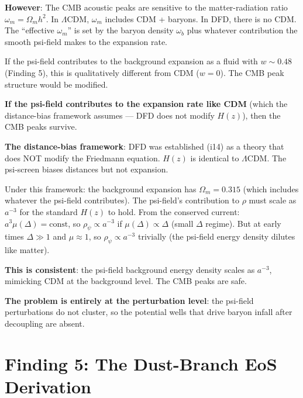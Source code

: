 \documentclass[11pt]{article}
\newcommand{\LCDM}{$\Lambda$CDM}
\begin{document}
\textbf{However}: The CMB acoustic peaks are sensitive to the
matter-radiation ratio $\omega_m = \Omega_m h^2$. In \LCDM,
$\omega_m$ includes CDM + baryons. In DFD, there is no CDM.
The ``effective $\omega_m$'' is set by the baryon density $\omega_b$
plus whatever contribution the smooth psi-field makes to the
expansion rate.

If the psi-field contributes to the background expansion as a fluid
with $w \sim 0.48$ (Finding 5), this is qualitatively different from
CDM ($w = 0$). The CMB peak structure would be modified.

\textbf{If the psi-field contributes to the expansion rate like CDM}
(which the distance-bias framework assumes --- DFD does not modify $H(z)$),
then the CMB peaks survive.

\textbf{The distance-bias framework}: DFD was established (i14) as a
theory that does NOT modify the Friedmann equation. $H(z)$ is identical
to \LCDM. The psi-screen biases distances but not expansion.

Under this framework: the background expansion has $\Omega_m = 0.315$
(which includes whatever the psi-field contributes). The psi-field's
contribution to $\rho$ must scale as $a^{-3}$ for the standard $H(z)$
to hold. From the conserved current: $a^3 \mu(\Delta) = \text{const}$,
so $\rho_\psi \propto a^{-3}$ if $\mu(\Delta) \propto \Delta$ (small
$\Delta$ regime). But at early times $\Delta \gg 1$ and
$\mu \approx 1$, so $\rho_\psi \propto a^{-3}$ trivially (the
psi-field energy density dilutes like matter).

\textbf{This is consistent}: the psi-field background energy density
scales as $a^{-3}$, mimicking CDM at the background level. The CMB
peaks are safe.

\textbf{The problem is entirely at the perturbation level}: the
psi-field perturbations do not cluster, so the potential wells
that drive baryon infall after decoupling are absent.


\part{Finding 5: The Dust-Branch EoS Derivation}
\label{part:eos}
\end{document}
